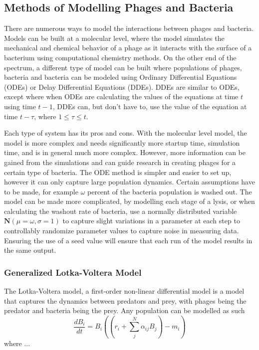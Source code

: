 \subsection{Methods of Modelling Phages and Bacteria}
There are numerous ways to model the interactions between phages and bacteria. Models can be built at a molecular level, where the model simulates the mechanical and chemical behavior of a phage as it interacts with the surface of a bacterium using computational chemistry methods. On the other end of the spectrum, a different type of model can be built where populations of phages, bacteria and bacteria can be modeled using Ordinary Differential Equations (ODEs) or Delay Differential Equations (DDEs). DDEs are similar to ODEs, except where when ODEs are calculating the values of the equations at time $t$ using time $t-1$, DDEs can, but don't have to, use the value of the equation at time $t-\tau$, where $1 \leq \tau \leq t$. \newline 

Each type of system has its pros and cons. With the molecular level model, the model is more complex and needs significantly more startup time, simulation time, and is in general much more complex. However, more information can be gained from the simulations and can guide research in creating phages for a certain type of bacteria. The ODE method is simpler and easier to set up, however it can only capture large population dynamics. Certain assumptions have to be made, for example $\omega$ percent of the bacteria population is washed out. The model can be made more complicated, by modelling each stage of a lysis, or when calculating the washout rate of bacteria, use a normally distributed variable $\textbf{N}(\mu=\omega, \sigma=1)$ to capture slight variations in a parameter at each step to controllably randomize parameter values to capture noise in measuring data. Ensuring the use of a seed value will ensure that each run of the model results in the same output. 

\subsubsection{Generalized Lotka-Voltera Model}
The Lotka-Voltera model, a first-order non-linear differential model is a model that captures the dynamics between predators and prey, with phages being the predator and bacteria being the prey. Any population can be modelled as such
\[ 
    \frac{d{B}_i}{dt} = {B}_i \left(\left(r_i + \sum_{j}^{N} \alpha_{ij}{B}_j \right) - m_i\right)
\]
where ...

